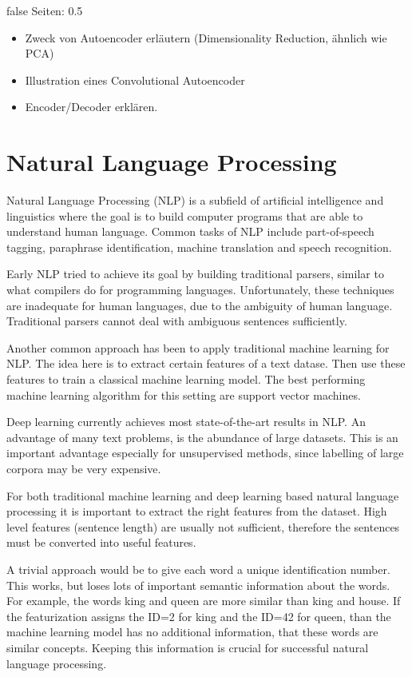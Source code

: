 \documentclass[draft,final,oneside]{vutinfth} %
\begin{document}
\if false
Seiten: 0.5
\begin{itemize}
\item Zweck von Autoencoder erläutern (Dimensionality Reduction, ähnlich wie PCA)
\item Illustration eines Convolutional Autoencoder
\item Encoder/Decoder erklären.
\end{itemize}
\fi


\section{Natural Language Processing} \label{nlpbackground}

Natural Language Processing (NLP) is a subfield of artificial intelligence and linguistics where the goal is to build computer programs that are able to understand human language. Common tasks of NLP include part-of-speech tagging, paraphrase identification, machine translation and speech recognition.

Early NLP tried to achieve its goal by building traditional parsers, similar to what compilers do for programming languages. Unfortunately, these techniques are inadequate for human languages, due to the ambiguity of human language. Traditional parsers cannot deal with ambiguous sentences sufficiently.

Another common approach has been to apply traditional machine learning for NLP. The idea here is to extract certain features of a  text datase. Then use these features to train a classical machine learning model. The best performing machine learning algorithm for this setting are support vector machines.

Deep learning currently achieves most state-of-the-art results in NLP. An advantage of many text problems, is the abundance of large datasets. This is an important advantage especially for unsupervised methods, since labelling of large corpora may be very expensive.

For both traditional machine learning and deep learning based natural language processing it is important to extract the right features from the dataset. High level features (sentence length) are usually not sufficient, therefore the sentences must be converted into useful features.

A trivial approach would be to give each word a unique identification number. This works, but loses lots of important semantic information about the words. For example, the words king and queen are more similar than king and house. If the featurization assigns the ID=2 for king and the ID=42 for queen, than the machine learning model has no additional information, that these words are similar concepts. Keeping this information is crucial for successful natural language processing.
\end{document}
